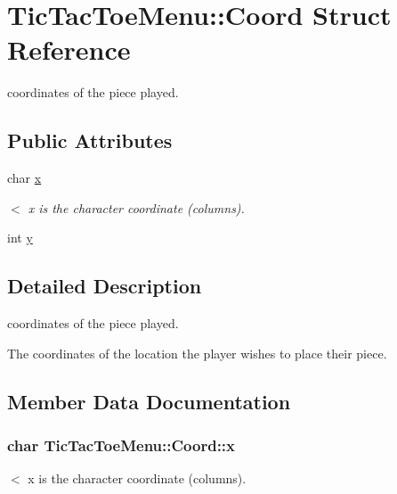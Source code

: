 \hypertarget{structTicTacToeMenu_1_1Coord}{\section{Tic\-Tac\-Toe\-Menu\-:\-:Coord Struct Reference}
\label{structTicTacToeMenu_1_1Coord}
}


coordinates of the piece played.  


\subsection*{Public Attributes}
\begin{DoxyCompactItemize}
\item 
char \hyperlink{structTicTacToeMenu_1_1Coord_a06b6253de92593cd52068185aae41a31}{x}
\begin{DoxyCompactList}\small\item\em $<$ x is the character coordinate (columns). \end{DoxyCompactList}\item 
int \hyperlink{structTicTacToeMenu_1_1Coord_a537516d9b1bdfff45765fbd4c7716a37}{y}
\end{DoxyCompactItemize}


\subsection{Detailed Description}
coordinates of the piece played. 

The coordinates of the location the player wishes to place their piece. 

\subsection{Member Data Documentation}
\hypertarget{structTicTacToeMenu_1_1Coord_a06b6253de92593cd52068185aae41a31}{
\subsubsection[{x}]{\setlength{\rightskip}{0pt plus 5cm}char Tic\-Tac\-Toe\-Menu\-::\-Coord\-::x}}\label{structTicTacToeMenu_1_1Coord_a06b6253de92593cd52068185aae41a31}


$<$ x is the character coordinate (columns). 

